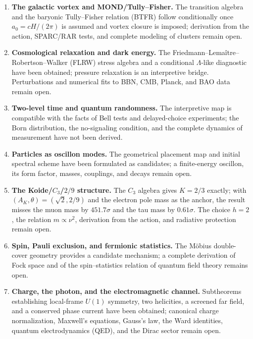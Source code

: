 \documentclass[11pt,a4paper]{article}
\begin{document}
\begin{enumerate}
\item \textbf{The galactic vortex and MOND/Tully--Fisher.} The transition algebra and the baryonic Tully--Fisher relation (BTFR) follow conditionally once $a_0=cH/(2\pi)$ is assumed and vortex closure is imposed; derivation from the action, SPARC/RAR tests, and complete modeling of clusters remain open.

\item \textbf{Cosmological relaxation and dark energy.} The Friedmann--Lemaître--Robertson--Walker (FLRW) stress algebra and a conditional $\Lambda$-like diagnostic have been obtained; pressure relaxation is an interpretive bridge. Perturbations and numerical fits to BBN, CMB, Planck, and BAO data remain open.

\item \textbf{Two-level time and quantum randomness.} The interpretive map is compatible with the facts of Bell tests and delayed-choice experiments; the Born distribution, the no-signaling condition, and the complete dynamics of measurement have not been derived.

\item \textbf{Particles as oscillon modes.} The geometrical placement map and initial spectral scheme have been formulated as candidates; a finite-energy oscillon, its form factor, masses, couplings, and decays remain open.

\item \textbf{The Koide/$C_3$/$2/9$ structure.} The $C_3$ algebra gives $K=2/3$ exactly; with $(A_K,\theta)=(\sqrt{2},2/9)$ and the electron pole mass as the anchor, the result misses the muon mass by $451.7\sigma$ and the tau mass by $0.61\sigma$. The choice $h=2$, the relation $m\propto\nu^2$, derivation from the action, and radiative protection remain open.

\item \textbf{Spin, Pauli exclusion, and fermionic statistics.} The Möbius double-cover geometry provides a candidate mechanism; a complete derivation of Fock space and of the spin--statistics relation of quantum field theory remains open.

\item \textbf{Charge, the photon, and the electromagnetic channel.} Subtheorems establishing local-frame $U(1)$ symmetry, two helicities, a screened far field, and a conserved phase current have been obtained; canonical charge normalization, Maxwell's equations, Gauss's law, the Ward identities, quantum electrodynamics (QED), and the Dirac sector remain open.


\end{enumerate}
\end{document}
